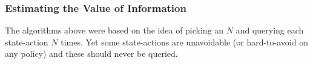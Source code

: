 \documentclass{article}
\newcommand{\St}{\mathcal{S}}
\newcommand{\A}{\mathcal{A}}
\begin{document}



\subsubsection{Estimating the Value of Information}

The algorithms above were based on the idea of picking an $N$ and querying each state-action $N$ times. Yet some state-actions are unavoidable (or hard-to-avoid on any policy) and these should never be queried. 

\end{document}
